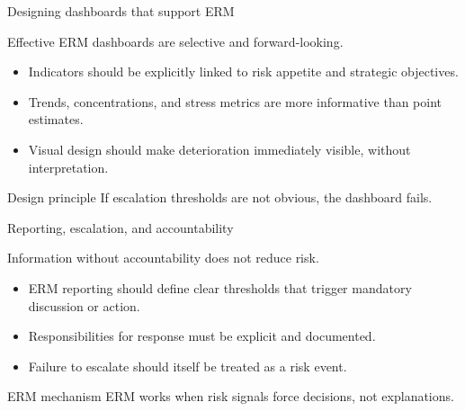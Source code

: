 \documentclass[aspectratio=169, 10pt]{beamer} %
\begin{document}
\begin{frame}{Designing dashboards that support ERM}

Effective ERM dashboards are selective and forward-looking.

\medskip

\begin{itemize}
  \item[$\bullet$] Indicators should be explicitly linked to risk appetite
  and strategic objectives.

  \item[$\bullet$] Trends, concentrations, and stress metrics are more
  informative than point estimates.

  \item[$\bullet$] Visual design should make deterioration immediately visible,
  without interpretation.
\end{itemize}

\begin{block}{Design principle}
If escalation thresholds are not obvious, the dashboard fails.
\end{block}

\end{frame}

\begin{frame}{Reporting, escalation, and accountability}

Information without accountability does not reduce risk.

\medskip

\begin{itemize}
  \item[$\bullet$] ERM reporting should define clear thresholds that trigger
  mandatory discussion or action.

  \item[$\bullet$] Responsibilities for response must be explicit and
  documented.

  \item[$\bullet$] Failure to escalate should itself be treated as a risk event.
\end{itemize}

\begin{block}{ERM mechanism}
ERM works when risk signals force decisions, not explanations.
\end{block}

\end{frame}
\end{document}

